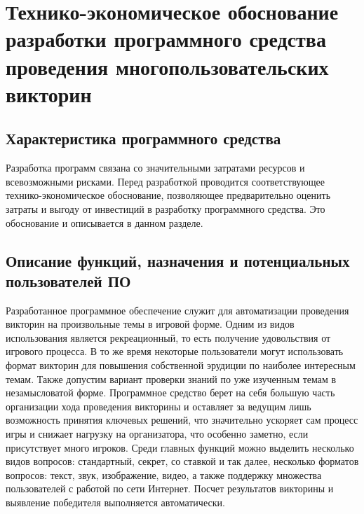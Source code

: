 


\section{Технико-экономическое обоснование разработки программного средства проведения многопользовательских викторин}
\label{sec:economics}

\subsection{Характеристика программного средства}
\label{sec:economics:description}

Разработка программ связана со значительными затратами ресурсов и всевозможными рисками. Перед разработкой проводится соответствующее 
технико-экономическое обоснование, позволяющее предварительно оценить затраты и выгоду от инвестиций в разработку программного средства. Это обоснование и описывается в данном разделе.

\subsection{Описание функций, назначения и потенциальных пользователей ПО}
\label{sec:economics:functions_and_target_audience}

Разработанное программное обеспечение служит для автоматизации проведения викторин на произвольные темы в игровой форме. Одним из видов использования является рекреационный, то есть получение
удовольствия от игрового процесса. В то же время некоторые пользователи могут использовать формат викторин для повышения собственной эрудиции по наиболее интересным темам. Также допустим
вариант проверки знаний по уже изученным темам в незамысловатой форме. Программное средство берет на себя большую часть организации хода проведения викторины и оставляет за ведущим лишь
возможность принятия ключевых решений, что значительно ускоряет сам процесс игры и снижает нагрузку на организатора, что особенно заметно, если присутствует много игроков. Среди главных функций
можно выделить несколько видов вопросов: стандартный, секрет, со ставкой и так далее, несколько форматов вопросов: текст, звук, изображение, видео, а также поддержку множества пользователей
с работой по сети Интернет. Посчет результатов викторины и выявление победителя выполняется автоматически.

